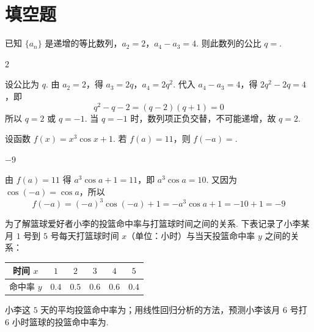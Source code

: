 \section{填空题}

\begin{problem}
已知 \(\{a_{n}\}\) 是递增的等比数列，\(a_{2} = 2\)，\(a_{4} - a_{3} = 4\). 则此数列的公比 \(q = \)\fillinblank{}.
\end{problem}

\begin{answer}
\(2\)
\end{answer}

\begin{solution}
设公比为 \(q\). 由 \(a_2=2\)，得 \(a_3=2q\)，\(a_4=2q^2\). 代入 \(a_4-a_3=4\)，得 \(2q^2-2q=4\)，即
\[
q^2-q-2=(q-2)(q+1)=0
\]
所以 \(q=2\) 或 \(q=-1\). 当 \(q=-1\) 时，数列项正负交替，不可能递增，故 \(q=2\).
\end{solution}

\begin{problem}
设函数 \( f(x) = x^{3}\cos x + 1 \). 若 \( f(a) = 11 \)，则 \( f(-a) = \)\fillinblank{}.
\end{problem}

\begin{answer}
\(-9\)
\end{answer}

\begin{solution}
由 \(f(a)=11\) 得 \(a^3\cos a+1=11\)，即 \(a^3\cos a=10\). 又因为 \(\cos(-a)=\cos a\)，所以
\[
f(-a)=(-a)^3\cos(-a)+1=-a^3\cos a+1=-10+1=-9
\]
\end{solution}

\begin{problem}
为了解篮球爱好者小李的投篮命中率与打篮球时间之间的关系. 下表记录了小李某月 \(1\) 号到 \(5\) 号每天打篮球时间 \(x\)（单位：小时）与当天投篮命中率 \(y\) 之间的关系：

\begin{center}
\begin{tabular}{c|ccccc}
时间 \(x\) & \(1\) & \(2\) & \(3\) & \(4\) & \(5\) \\
\hline
命中率 \(y\) & \(0.4\) & \(0.5\) & \(0.6\) & \(0.6\) & \(0.4\)
\end{tabular}
\end{center}

小李这 \(5\) 天的平均投篮命中率为\fillinblank{}；用线性回归分析的方法，预测小李该月 \(6\) 号打 \(6\) 小时篮球的投篮命中率为\fillinblank{}.
\end{problem}

